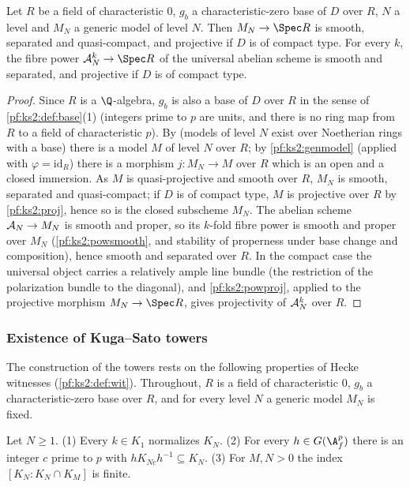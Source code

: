 \begin{lemma}\label{pf:ks2:gensm}
Let $R$ be a field of characteristic $0$, $g_b$ a characteristic-zero base of $D$ over $R$, $N$ a
level and $M_N$ a generic model of level $N$. Then $M_N\to\Spec R$ is smooth, separated and
quasi-compact, and projective if $D$ is of compact type. For every $k$, the fibre power
$\kstwoKS_N^k\to\Spec R$ of the universal abelian scheme is smooth and separated, and projective
if $D$ is of compact type.
\end{lemma}

\begin{proof}
Since $R$ is a $\Q$-algebra, $g_b$ is also a base of $D$ over $R$ in the sense of
\cref{pf:ks2:def:base}(1) (integers prime to $p$ are units, and there is no ring map from $R$ to
a field of characteristic $p$). By  (models of
level $N$ exist over Noetherian rings with a base) there is a model $M$ of level $N$ over $R$; by
\cref{pf:ks2:genmodel} (applied with $\varphi=\mathrm{id}_R$) there is a morphism
$j\colon M_N\to M$ over $R$ which is an open and a closed immersion. As $M$ is quasi-projective and
smooth over $R$, $M_N$ is smooth, separated and quasi-compact; if $D$ is of compact type, $M$ is
projective over $R$ by \cref{pf:ks2:proj}, hence so is the closed subscheme $M_N$. The abelian
scheme $\mathcal{A}_N\to M_N$ is smooth and proper, so its $k$-fold fibre power is smooth and proper
over $M_N$ (\cref{pf:ks2:powsmooth}, and stability of properness under base change and
composition), hence smooth and separated over $R$. In the compact case the universal object carries
a relatively ample line bundle (the restriction of the polarization bundle to the diagonal), and
\cref{pf:ks2:powproj}, applied to the projective morphism $M_N\to\Spec R$, gives projectivity of
$\mathcal{A}_N^k$ over $R$.
\end{proof}

\subsubsection{Existence of Kuga--Sato towers}

The construction of the towers rests on the following properties of Hecke witnesses
(\cref{pf:ks2:def:wit}). Throughout, $R$ is a field of characteristic $0$, $g_b$ a
characteristic-zero base over $R$, and for every level $N$ a generic model $M_N$ is fixed.

\begin{lemma}\label{pf:ks2:kn}
Let $N\ge1$. (1) Every $k\in K_1$ normalizes $K_N$. (2) For every $h\in\kstwoG$ there is an integer
$c$ prime to $p$ with $hK_{Nc}h^{-1}\subseteq K_N$. (3) For $M,N>0$ the index $[K_N:K_N\cap K_M]$ is
finite.
\end{lemma}

